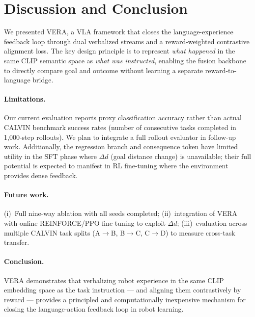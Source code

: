 \documentclass{article}
\newcommand{\vera}{\textsc{VERA}}
\begin{document}
\section{Discussion and Conclusion}
\label{sec:conclusion}

We presented \vera{}, a VLA framework that closes the language-experience feedback
loop through dual verbalized streams and a reward-weighted contrastive alignment loss.
The key design principle is to represent \emph{what happened} in the same CLIP
semantic space as \emph{what was instructed}, enabling the fusion backbone to
directly compare goal and outcome without learning a separate reward-to-language bridge.

\paragraph{Limitations.}
Our current evaluation reports proxy classification accuracy rather than actual
CALVIN benchmark success rates (number of consecutive tasks completed in 1,000-step rollouts).
We plan to integrate a full rollout evaluator in follow-up work.
Additionally, the regression branch and consequence token have limited utility in
the SFT phase where $\Delta d$ (goal distance change) is unavailable; their full
potential is expected to manifest in RL fine-tuning where the environment provides
dense feedback.

\paragraph{Future work.}
(i)~Full nine-way ablation with all seeds completed;
(ii)~integration of VERA with online REINFORCE/PPO fine-tuning to exploit $\Delta d$;
(iii)~evaluation across multiple CALVIN task splits (A$\to$B, B$\to$C, C$\to$D) to
measure cross-task transfer.

\paragraph{Conclusion.}
\vera{} demonstrates that verbalizing robot experience in the same CLIP embedding
space as the task instruction — and aligning them contrastively by reward — provides
a principled and computationally inexpensive mechanism for closing the language-action
feedback loop in robot learning.
\end{document}
